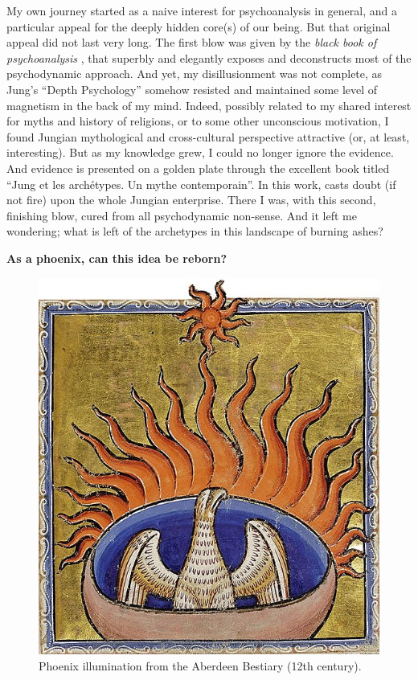 \documentclass[]{book}
\begin{document}
My own journey started as a naive interest for psychoanalysis in general, and a particular appeal for the deeply hidden core(s) of our being. But that original appeal did not last very long. The first blow was given by the \emph{black book of psychoanalysis} \citep[``Le livre noir de la psychanalyse'';][]{borch2005livre}, that superbly and elegantly exposes and deconstructs most of the psychodynamic approach. And yet, my disillusionment was not complete, as Jung's ``Depth Psychology'' somehow resisted and maintained some level of magnetism in the back of my mind. Indeed, possibly related to my shared interest for myths and history of religions, or to some other unconscious motivation, I found Jungian mythological and cross-cultural perspective attractive (or, at least, interesting). But as my knowledge grew, I could no longer ignore the evidence. And evidence is presented on a golden plate through the excellent book titled ``Jung et les archétypes. Un mythe contemporain''. In this work, \citet{lequellec2013jung} casts doubt (if not fire) upon the whole Jungian enterprise. There I was, with this second, finishing blow, cured from all psychodynamic non-sense. And it left me wondering; what is left of the archetypes in this landscape of burning ashes?

\textbf{As a phoenix, can this idea be reborn?}

\begin{figure}

{\centering \includegraphics[width=\textwidth]{img/phoenix_aberdeen_bestiary} 

}

\caption{Phoenix illumination from the Aberdeen Bestiary (12th century).}\label{fig:unnamed-chunk-2}
\end{figure}
\end{document}
